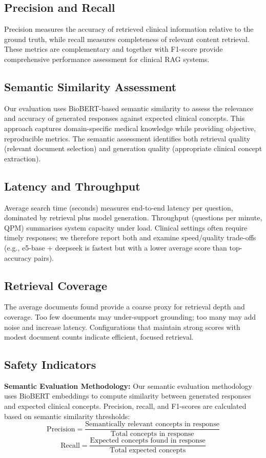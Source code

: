 \subsection{Precision and Recall}
Precision measures the accuracy of retrieved clinical information relative to the ground truth, while recall measures completeness of relevant content retrieval. These metrics are complementary and together with F1-score provide comprehensive performance assessment for clinical RAG systems.

\subsection{Semantic Similarity Assessment}
Our evaluation uses BioBERT-based semantic similarity to assess the relevance and accuracy of generated responses against expected clinical concepts. This approach captures domain-specific medical knowledge while providing objective, reproducible metrics. The semantic assessment identifies both retrieval quality (relevant document selection) and generation quality (appropriate clinical concept extraction).

\subsection{Latency and Throughput}
Average search time (seconds) measures end-to-end latency per question, dominated by retrieval plus model generation. Throughput (questions per minute, QPM) summarises system capacity under load. Clinical settings often require timely responses; we therefore report both and examine speed/quality trade-offs (e.g., e5-base + deepseek is fastest but with a lower average score than top-accuracy pairs).

\subsection{Retrieval Coverage}
The average documents found provide a coarse proxy for retrieval depth and coverage. Too few documents may under-support grounding; too many may add noise and increase latency. Configurations that maintain strong scores with modest document counts indicate efficient, focused retrieval.

\subsection{Safety Indicators}

\textbf{Semantic Evaluation Methodology:}
Our semantic evaluation methodology uses BioBERT embeddings to compute similarity between generated responses and expected clinical concepts. Precision, recall, and F1-scores are calculated based on semantic similarity thresholds:
\begin{equation}
\text{Precision} = \frac{\text{Semantically relevant concepts in response}}{\text{Total concepts in response}}
\end{equation}
\begin{equation}
\text{Recall} = \frac{\text{Expected concepts found in response}}{\text{Total expected concepts}}
\end{equation}

